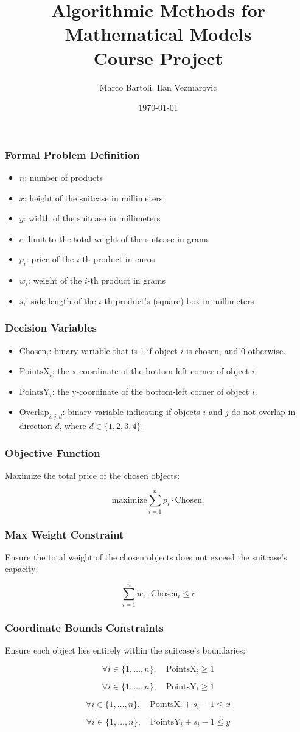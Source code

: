\documentclass{beamer}
\title{Algorithmic Methods for Mathematical Models\\
 Course Project}
\author{Marco Bartoli, Ilan Vezmarovic}
\institute{UPC Universitat Politècnica de Catalunya}
\date{\today}
\begin{document}
\frame{\titlepage}

\begin{frame}
\frametitle{Formal Problem Definition}
\begin{itemize}
    \item $n$: number of products
    \item $x$: height of the suitcase in millimeters
    \item $y$: width of the suitcase in millimeters
    \item $c$: limit to the total weight of the suitcase in grams
    \item $p_i$: price of the $i$-th product in euros
    \item $w_i$: weight of the $i$-th product in grams
    \item $s_i$: side length of the $i$-th product's (square) box in millimeters
\end{itemize}
\end{frame}


\begin{frame}
\frametitle{Decision Variables}
\begin{itemize}
    \item $\text{Chosen}_i$: binary variable that is 1 if object $i$ is chosen, and 0 otherwise.
    \item $\text{PointsX}_i$: the x-coordinate of the bottom-left corner of object $i$.
    \item $\text{PointsY}_i$: the y-coordinate of the bottom-left corner of object $i$.
    \item $\text{Overlap}_{i,j,d}$: binary variable indicating if objects $i$ and $j$ do not overlap in direction $d$, where $d \in \{1, 2, 3, 4\}$.
\end{itemize}
\end{frame}

\begin{frame}
\frametitle{Objective Function}
Maximize the total price of the chosen objects:

\[
\text{maximize} \sum_{i=1}^n p_i \cdot \text{Chosen}_i
\]
\end{frame}


\begin{frame}
\frametitle{Max Weight Constraint}
Ensure the total weight of the chosen objects does not exceed the suitcase's capacity:

\[
\sum_{i=1}^n w_i \cdot \text{Chosen}_i \leq c
\]
\end{frame}

\begin{frame}
\frametitle{Coordinate Bounds Constraints}
Ensure each object lies entirely within the suitcase's boundaries:

\[
\forall i \in \{1, \ldots, n\}, \quad \text{PointsX}_i \geq 1
\]

\[
\forall i \in \{1, \ldots, n\}, \quad \text{PointsY}_i \geq 1
\]

\[
\forall i \in \{1, \ldots, n\}, \quad \text{PointsX}_i + s_i - 1 \leq x
\]

\[
\forall i \in \{1, \ldots, n\}, \quad \text{PointsY}_i + s_i - 1 \leq y
\]
\end{frame}
\end{document}
